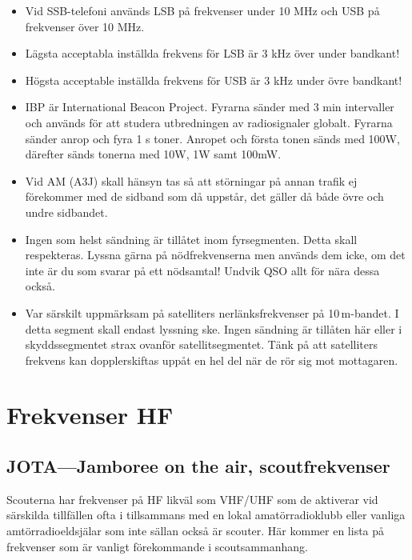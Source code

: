 \begin{itemize}
\item Vid SSB-telefoni används LSB på frekvenser under 10 MHz och USB på frekvenser över 10 MHz.
\item Lägsta acceptabla inställda frekvens för LSB är 3 kHz över under bandkant! 
\item Högsta acceptable inställda frekvens för USB är 3 kHz under övre bandkant!
\item IBP är International Beacon Project. Fyrarna sänder med 3 min intervaller och används för att studera utbredningen av radiosignaler globalt. Fyrarna sänder anrop och fyra 1 s toner. Anropet och första tonen sänds med 100W, därefter sänds tonerna med 10W, 1W samt 100mW.
\item Vid AM (A3J) skall hänsyn tas så att störningar på annan trafik ej fö\-re\-kom\-mer med de sidband som då uppstår, det gäller då både övre och undre sidbandet.
\item Ingen som helst sändning är tillåtet inom fyrsegmenten. Detta skall respekteras. Lyssna gärna på nödfrekvenserna men används dem icke, om det inte är du som svarar på ett nödsamtal! Undvik QSO allt för nära dessa också.
\item Var särskilt uppmärksam på satelliters nerlänksfrekvenser på 10\,m-bandet. I detta segment skall endast lyssning ske. Ingen sändning är tillåten här eller i skyddssegmentet strax ovanför satellitsegmentet. Tänk på att satelliters frekvens kan dopplerskiftas uppåt en hel del när de rör sig mot mottagaren.
\end{itemize}

\section{Frekvenser HF}



\subsection{JOTA---Jamboree on the air, scoutfrekvenser}

Scouterna har frekvenser på HF likväl som VHF/UHF som de aktiverar vid särskilda tillfällen ofta i tillsammans med en lokal amatörradioklubb eller vanliga amtörradioeldsjälar som inte sällan också är scouter. Här kommer en lista på frekvenser som är vanligt förekommande i scoutsammanhang.

